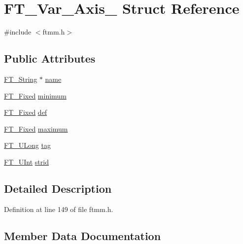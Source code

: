 \hypertarget{struct_f_t___var___axis__}{}\section{F\+T\+\_\+\+Var\+\_\+\+Axis\+\_\+ Struct Reference}
\label{struct_f_t___var___axis__}


{\ttfamily \#include $<$ftmm.\+h$>$}

\subsection*{Public Attributes}
\begin{DoxyCompactItemize}
\item 
\mbox{\hyperlink{fttypes_8h_a9846214585359eb2ba6bbb0e6de30639}{F\+T\+\_\+\+String}} $\ast$ \mbox{\hyperlink{struct_f_t___var___axis___a8d0e0af322a692999ec3733a3e18a5a4}{name}}
\item 
\mbox{\hyperlink{fttypes_8h_a5f5a679cc09f758efdd0d1c5feed3c3d}{F\+T\+\_\+\+Fixed}} \mbox{\hyperlink{struct_f_t___var___axis___aae13a8dea1c96bc3949019e8117e7edb}{minimum}}
\item 
\mbox{\hyperlink{fttypes_8h_a5f5a679cc09f758efdd0d1c5feed3c3d}{F\+T\+\_\+\+Fixed}} \mbox{\hyperlink{struct_f_t___var___axis___a37a6ca4188a6bfd95d9d06538bf1a3dd}{def}}
\item 
\mbox{\hyperlink{fttypes_8h_a5f5a679cc09f758efdd0d1c5feed3c3d}{F\+T\+\_\+\+Fixed}} \mbox{\hyperlink{struct_f_t___var___axis___a5704641439e9f318cf3c2b73864e3260}{maximum}}
\item 
\mbox{\hyperlink{fttypes_8h_a4fac88bdba78eb76b505efa6e4fbf3f5}{F\+T\+\_\+\+U\+Long}} \mbox{\hyperlink{struct_f_t___var___axis___a01ef9396e34e740c2d2b8c7117094624}{tag}}
\item 
\mbox{\hyperlink{fttypes_8h_abcb8db4dbf35d2b55a9e8c7b0926dc52}{F\+T\+\_\+\+U\+Int}} \mbox{\hyperlink{struct_f_t___var___axis___a297d28ab0f5666e56d7575249ccc75d7}{strid}}
\end{DoxyCompactItemize}


\subsection{Detailed Description}


Definition at line 149 of file ftmm.\+h.



\subsection{Member Data Documentation}
\mbox{\label{struct_f_t___var___axis___a37a6ca4188a6bfd95d9d06538bf1a3dd}} 
